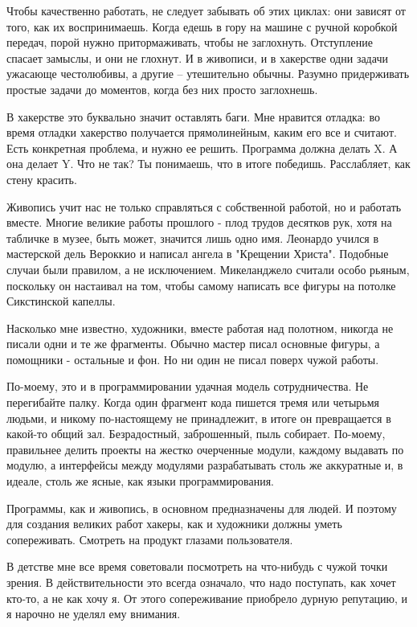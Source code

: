 \documentclass[ebook,12pt,oneside,openany]{memoir}
\begin{document}
Чтобы качественно работать, не следует забывать об этих циклах: они
зависят от того, как их воспринимаешь. Когда едешь в гору на машине с
ручной коробкой передач, порой нужно притормаживать, чтобы не
заглохнуть. Отступление спасает замыслы, и они не глохнут. И в
живописи, и в хакерстве одни задачи ужасающе честолюбивы, а другие --
утешительно обычны. Разумно придерживать простые задачи до моментов,
когда без них просто заглохнешь.

В хакерстве это буквально значит оставлять баги. Мне нравится отладка:
во время отладки хакерство получается прямолинейным, каким его все и
считают. Есть конкретная проблема, и нужно ее решить. Программа должна
делать X. А она делает Y. Что не так? Ты понимаешь, что в итоге
победишь. Расслабляет, как стену красить.

Живопись учит нас не только справляться с собственной работой, но и
работать вместе. Многие великие работы прошлого - плод трудов десятков
рук, хотя на табличке в музее, быть может, значится лишь одно имя.
Леонардо учился в мастерской дель Вероккио и написал ангела в
"Крещении Христа". Подобные случаи были правилом, а не исключением.
Микеланджело считали особо рьяным, поскольку он настаивал на том,
чтобы самому написать все фигуры на потолке Сикстинской капеллы.

Насколько мне известно, художники, вместе работая над полотном,
никогда не писали одни и те же фрагменты. Обычно мастер писал основные
фигуры, а помощники - остальные и фон. Но ни один не писал поверх
чужой работы.

По-моему, это и в программировании удачная модель сотрудничества. Не
перегибайте палку. Когда один фрагмент кода пишется тремя или четырьмя
людьми, и никому по-настоящему не принадлежит, в итоге он превращается
в какой-то общий зал. Безрадостный, заброшенный, пыль собирает.
По-моему, правильнее делить проекты на жестко очерченные модули,
каждому выдавать по модулю, а интерфейсы между модулями разрабатывать
столь же аккуратные и, в идеале, столь же ясные, как языки
программирования.

Программы, как и живопись, в основном предназначены для людей. И
поэтому для создания великих работ хакеры, как и художники должны
уметь сопереживать. Смотреть на продукт глазами пользователя.

В детстве мне все время советовали посмотреть на что-нибудь с чужой
точки зрения. В действительности это всегда означало, что надо
поступать, как хочет кто-то, а не как хочу я. От этого сопереживание
приобрело дурную репутацию, и я нарочно не уделял ему внимания.
\end{document}
